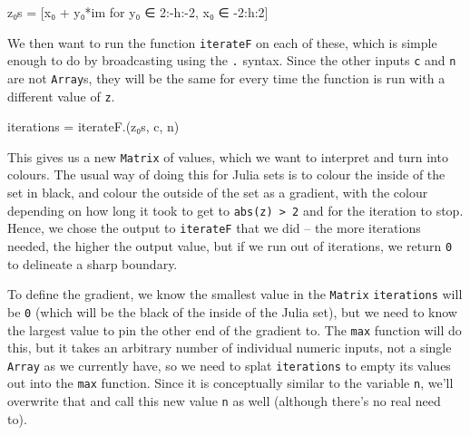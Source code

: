 \documentclass[
  letterpaper,
  DIV=11,
  numbers=noendperiod]{scrreprt}
\newenvironment{Shaded}{\begin{snugshade}}{\end{snugshade}}
\newcommand{\ConstantTok}[1]{\textcolor[rgb]{0.56,0.35,0.01}{#1}}
\newcommand{\FloatTok}[1]{\textcolor[rgb]{0.68,0.00,0.00}{#1}}
\newcommand{\FunctionTok}[1]{\textcolor[rgb]{0.28,0.35,0.67}{#1}}
\newcommand{\NormalTok}[1]{\textcolor[rgb]{0.00,0.23,0.31}{#1}}
\newcommand{\OperatorTok}[1]{\textcolor[rgb]{0.37,0.37,0.37}{#1}}
\begin{document}
\begin{Shaded}
\begin{Highlighting}[]
\NormalTok{z₀s }\OperatorTok{=}\NormalTok{ [x₀ }\OperatorTok{+}\NormalTok{ y₀}\OperatorTok{*}\ConstantTok{im}\NormalTok{ for y₀ }\OperatorTok{∈} \FloatTok{2}\OperatorTok{:{-}}\NormalTok{h}\OperatorTok{:{-}}\FloatTok{2}\NormalTok{, x₀ }\OperatorTok{∈} \OperatorTok{{-}}\FloatTok{2}\OperatorTok{:}\NormalTok{h}\OperatorTok{:}\FloatTok{2}\NormalTok{]}
\end{Highlighting}
\end{Shaded}

We then want to run the function \texttt{iterateF} on each of these,
which is simple enough to do by broadcasting using the \texttt{.}
syntax. Since the other inputs \texttt{c} and \texttt{n} are not
\texttt{Array}s, they will be the same for every time the function is
run with a different value of \texttt{z}.

\begin{Shaded}
\begin{Highlighting}[]
\NormalTok{iterations }\OperatorTok{=} \FunctionTok{iterateF}\NormalTok{.(z₀s, c, n)}
\end{Highlighting}
\end{Shaded}

This gives us a new \texttt{Matrix} of values, which we want to
interpret and turn into colours. The usual way of doing this for Julia
sets is to colour the inside of the set in black, and colour the outside
of the set as a gradient, with the colour depending on how long it took
to get to \texttt{abs(z)\ \textgreater{}\ 2} and for the iteration to
stop. Hence, we chose the output to \texttt{iterateF} that we did -- the
more iterations needed, the higher the output value, but if we run out
of iterations, we return \texttt{0} to delineate a sharp boundary.

To define the gradient, we know the smallest value in the
\texttt{Matrix} \texttt{iterations} will be \texttt{0} (which will be
the black of the inside of the Julia set), but we need to know the
largest value to pin the other end of the gradient to. The \texttt{max}
function will do this, but it takes an arbitrary number of individual
numeric inputs, not a single \texttt{Array} as we currently have, so we
need to splat \texttt{iterations} to empty its values out into the
\texttt{max} function. Since it is conceptually similar to the variable
\texttt{n}, we'll overwrite that and call this new value \texttt{n} as
well (although there's no real need to).
\end{document}
